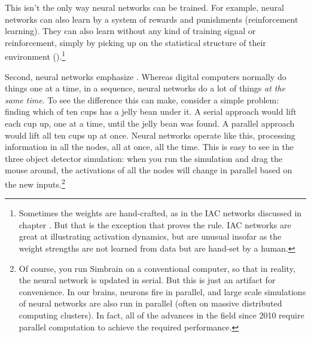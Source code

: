 
This isn't the only way neural networks can be trained. For example, neural networks can also learn by a system of rewards and punishments (reinforcement learning). They can also learn without any kind of training signal or reinforcement, simply by picking up on the statistical structure of their environment ().\footnote{Sometimes the weights are hand-crafted, as in the IAC networks discussed in chapter . But that is the exception that proves the rule. IAC networks are great at illustrating activation dynamics, but are unusual insofar as the weight strengths are not learned from data but are hand-set by a human.}

Second, neural networks emphasize . Whereas digital computers normally do things one at a time, in a sequence, neural networks do a lot of things \emph{at the same time}. To see the difference this can make, consider a simple problem: finding which of ten cups has a jelly bean under it. A serial approach would lift each cup up, one at a time, until the jelly bean was found. A parallel approach would lift all ten cups up at once. Neural networks operate like this, processing information in all the nodes, all at once, all the time. This is easy to see  in the three object detector simulation: when you run the simulation and drag the mouse around, the activations of all the nodes will change in parallel based on the new inputs.\footnote{Of course, you run Simbrain on a conventional computer, so that in reality, the neural network is updated in serial. But this is just an artifact for convenience. In our brains, neurons fire in parallel, and large scale simulations of neural networks are also run in parallel (often on massive distributed computing clusters). In fact, all of the advances in the field since 2010 require parallel computation to achieve the required performance.} 

